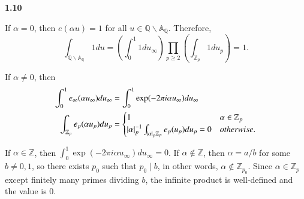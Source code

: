 \documentclass[a4paper, 12pt]{article}
\theoremstyle{Mydefinition}
\theoremstyle{Mytheorem}
\begin{document}
\noindent \textbf{1.10}

If $\alpha = 0$, then $e(\alpha u) = 1$ for all $u\in \mathbb{Q}\backslash \mathbb{A}_\mathbb{Q}$. Therefore,
\begin{equation}
    \int_{\mathbb{Q}\backslash\mathbb{A}_\mathbb{Q}} 1 du = \left(\int_0^1 1 du_\infty\right)\prod_{p\geq 2}\left(\int_{\mathbb{Z}_p} 1 du_p\right) = 1.
\end{equation}

If $\alpha\neq 0$, then 
\begin{equation}
\begin{split}
    \int_0^1 e_\infty (\alpha u_\infty) du_\infty &= \int_0^1 \exp(-2\pi i \alpha u_\infty) du_\infty\\
    \int_{\mathbb{Z}_p} e_p(\alpha u_p)du_p &= \begin{cases}
    1 & \alpha\in \mathbb{Z}_p\\
    \abs{\alpha}_p^{-1}\int_{\abs{\alpha}_p\mathbb{Z}_p}e_p(u_p)du_p = 0 & otherwise.
    \end{cases}
\end{split}
\end{equation}

If $\alpha\in \mathbb{Z}$, then $\int_0^1 \exp(-2\pi i \alpha u_\infty) du_\infty = 0$. If $\alpha\not\in \mathbb{Z}$, then $\alpha = a/b$ for some $b\neq 0, 1$, so there exists $p_0$ such that $p_0\mid b$, in other words, $\alpha\not\in \mathbb{Z}_{p_0}$. Since $\alpha\in \mathbb{Z}_p$ except finitely many primes dividing $b$, the infinite product is well-defined and the value is $0$.
\end{document}
